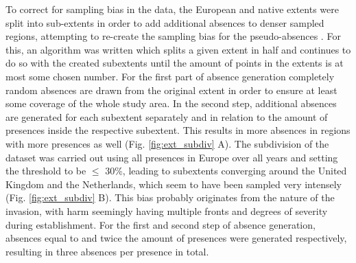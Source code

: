 \documentclass[12pt,a4paper]{article}
\begin{document}
To correct for sampling bias in the data, the European and native extents were split into sub-extents in order to add additional absences to denser sampled regions, attempting to re-create the sampling bias for the pseudo-absences \autocite{phillips2009samplebias}.
For this, an algorithm was written which splits a given extent in half and continues to do so with the created subextents until the amount of points in the extents is at most some chosen number.
For the first part of absence generation completely random absences are drawn from the original extent in order to ensure at least some coverage of the whole study area.
In the second step, additional absences are generated for each subextent separately and in relation to the amount of presences inside the respective subextent.
This results in more absences in regions with more presences as well (Fig. \ref{fig:ext_subdiv} A).
The subdivision of the dataset was carried out using all presences in Europe over all years and setting the threshold to be $\leq$ 30\%, leading to subextents converging around the United Kingdom and the Netherlands, which seem to have been sampled very intensely (Fig. \ref{fig:ext_subdiv} B).
This bias probably originates from the nature of the invasion, with \gls{harm} seemingly having multiple fronts and degrees of severity during establishment.
For the first and second step of absence generation, absences equal to and twice the amount of presences were generated respectively, resulting in three absences per presence in total.
\end{document}
